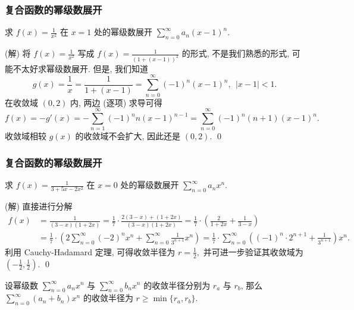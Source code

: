 \begin{frame}
\frametitle{复合函数的幂级数展开}

\begin{eg}
求 $f(x) = \frac{1}{x^2}$ 在 $x = 1$ 处的幂级数展开 $\sum_{n=0}^\infty a_n (x - 1)^n.$
\end{eg}

\pause
\vspace{0.5em}

\startproof[bg=yellow, fg=red](解)
将 $f(x) = \frac{1}{x^2}$ 写成 $f(x) = \frac{1}{(1 + (x - 1))^2}$ 的形式, 不是我们熟悉的形式, 可能不太好求幂级数展开.
\pause
但是, 我们知道
\[
g(x) = \frac{1}{x} = \frac{1}{1 + (x - 1)} = \sum_{n=0}^\infty (-1)^n (x - 1)^n, ~~ |x - 1| < 1.
\]
\pause
在收敛域 $(0, 2)$ 内, 两边 (逐项) 求导可得
\[
f(x) = -g'(x) = -\sum_{n=1}^\infty (-1)^n n (x - 1)^{n-1} = \sum_{n=0}^\infty (-1)^n (n + 1) (x - 1)^n.
\]
收敛域相较 $g(x)$ 的收敛域不会扩大, 因此还是 $(0, 2)$.
\qed

\end{frame}


\begin{frame}
\frametitle{复合函数的幂级数展开}

\begin{eg}
求 $f(x) = \frac{1}{3 + 5x - 2x^2}$ 在 $x = 0$ 处的幂级数展开 $\sum_{n=0}^\infty a_n x^n.$
\end{eg}

\pause

\startproof[bg=yellow, fg=red](解)
直接进行分解
\begin{align*}
f(x) & = \frac{1}{(3 - x)(1 + 2x)} = \frac{1}{7} \cdot \frac{2(3 - x) + (1 + 2x)}{(3 - x)(1 + 2x)} = \frac{1}{7} \cdot \left( \frac{2}{1 + 2x} + \frac{1}{3 - x} \right) \\
& = \frac{1}{7} \cdot \left( 2 \sum_{n=0}^\infty (-2)^n x^n + \sum_{n=0}^\infty \frac{1}{3^{n+1}} x^n \right) = \frac{1}{7} \cdot \sum_{n=0}^\infty \left( (-1)^n \cdot 2^{n+1} + \frac{1}{3^{n+1}} \right) x^n.
\end{align*}
\pause
利用 Cauchy-Hadamard 定理, 可得收敛半径为 $r = \frac{1}{2},$ 并可进一步验证其收敛域为 $\left(-\frac{1}{2}, \frac{1}{2}\right).$
\qed

\pause

\begin{remark}
设幂级数 $\sum_{n=0}^\infty a_n x^n$ 与 $\sum_{n=0}^\infty b_n x^n$ 的收敛半径分别为 $r_a$ 与 $r_b$, 那么 $\sum_{n=0}^\infty (a_n + b_n) x^n$ 的收敛半径为 $r \geqslant \min \{ r_a, r_b \}.$
\end{remark}

\end{frame}

